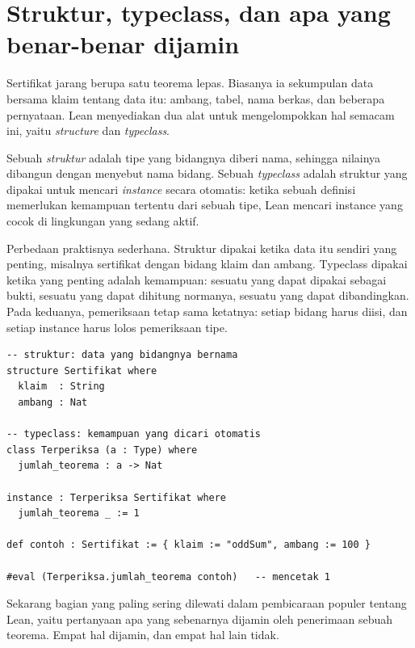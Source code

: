 \section{Struktur, typeclass, dan apa yang benar-benar dijamin}


Sertifikat jarang berupa satu teorema lepas. Biasanya ia sekumpulan data bersama klaim tentang
data itu: ambang, tabel, nama berkas, dan beberapa pernyataan. Lean menyediakan dua alat untuk
mengelompokkan hal semacam ini, yaitu \emph{structure} dan \emph{typeclass}.


\begin{definisi}
Sebuah \emph{struktur} adalah tipe yang bidangnya diberi nama, sehingga nilainya dibangun dengan
menyebut nama bidang. Sebuah \emph{typeclass} adalah struktur yang dipakai untuk mencari
\emph{instance} secara otomatis: ketika sebuah definisi memerlukan kemampuan tertentu dari sebuah
tipe, Lean mencari instance yang cocok di lingkungan yang sedang aktif.
\end{definisi}

Perbedaan praktisnya sederhana. Struktur dipakai ketika data itu sendiri yang penting, misalnya
sertifikat dengan bidang klaim dan ambang. Typeclass dipakai ketika yang penting adalah kemampuan:
sesuatu yang dapat dipakai sebagai bukti, sesuatu yang dapat dihitung normanya, sesuatu yang dapat
dibandingkan. Pada keduanya, pemeriksaan tetap sama ketatnya: setiap bidang harus diisi, dan
setiap instance harus lolos pemeriksaan tipe.

\begin{verbatim}
-- struktur: data yang bidangnya bernama
structure Sertifikat where
  klaim  : String
  ambang : Nat

-- typeclass: kemampuan yang dicari otomatis
class Terperiksa (a : Type) where
  jumlah_teorema : a -> Nat

instance : Terperiksa Sertifikat where
  jumlah_teorema _ := 1

def contoh : Sertifikat := { klaim := "oddSum", ambang := 100 }

#eval (Terperiksa.jumlah_teorema contoh)   -- mencetak 1
\end{verbatim}

Sekarang bagian yang paling sering dilewati dalam pembicaraan populer tentang Lean, yaitu
pertanyaan apa yang sebenarnya dijamin oleh penerimaan sebuah teorema. Empat hal dijamin, dan
empat hal lain tidak.

